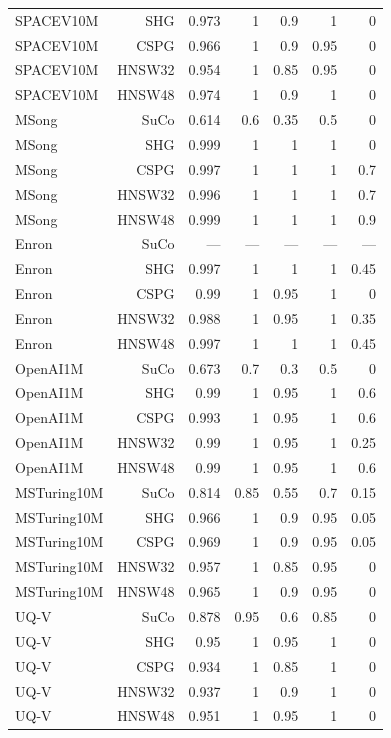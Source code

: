 \begin{table}[t]
\begin{tabular}{lrrrrrr}
SPACEV10M & SHG & 0.973 & 1 & 0.9 & 1 & 0 \\
SPACEV10M & CSPG & 0.966 & 1 & 0.9 & 0.95 & 0 \\
SPACEV10M & HNSW32 & 0.954 & 1 & 0.85 & 0.95 & 0 \\
SPACEV10M & HNSW48 & 0.974 & 1 & 0.9 & 1 & 0 \\
MSong & SuCo & 0.614 & 0.6 & 0.35 & 0.5 & 0 \\
MSong & SHG & 0.999 & 1 & 1 & 1 & 0 \\
MSong & CSPG & 0.997 & 1 & 1 & 1 & 0.7 \\
MSong & HNSW32 & 0.996 & 1 & 1 & 1 & 0.7 \\
MSong & HNSW48 & 0.999 & 1 & 1 & 1 & 0.9 \\
Enron & SuCo & — & — & — & — & — \\
Enron & SHG & 0.997 & 1 & 1 & 1 & 0.45 \\
Enron & CSPG & 0.99 & 1 & 0.95 & 1 & 0 \\
Enron & HNSW32 & 0.988 & 1 & 0.95 & 1 & 0.35 \\
Enron & HNSW48 & 0.997 & 1 & 1 & 1 & 0.45 \\
OpenAI1M & SuCo & 0.673 & 0.7 & 0.3 & 0.5 & 0 \\
OpenAI1M & SHG & 0.99 & 1 & 0.95 & 1 & 0.6 \\
OpenAI1M & CSPG & 0.993 & 1 & 0.95 & 1 & 0.6 \\
OpenAI1M & HNSW32 & 0.99 & 1 & 0.95 & 1 & 0.25 \\
OpenAI1M & HNSW48 & 0.99 & 1 & 0.95 & 1 & 0.6 \\
MSTuring10M & SuCo & 0.814 & 0.85 & 0.55 & 0.7 & 0.15 \\
MSTuring10M & SHG & 0.966 & 1 & 0.9 & 0.95 & 0.05 \\
MSTuring10M & CSPG & 0.969 & 1 & 0.9 & 0.95 & 0.05 \\
MSTuring10M & HNSW32 & 0.957 & 1 & 0.85 & 0.95 & 0 \\
MSTuring10M & HNSW48 & 0.965 & 1 & 0.9 & 0.95 & 0 \\
UQ-V & SuCo & 0.878 & 0.95 & 0.6 & 0.85 & 0 \\
UQ-V & SHG & 0.95 & 1 & 0.95 & 1 & 0 \\
UQ-V & CSPG & 0.934 & 1 & 0.85 & 1 & 0 \\
UQ-V & HNSW32 & 0.937 & 1 & 0.9 & 1 & 0 \\
UQ-V & HNSW48 & 0.951 & 1 & 0.95 & 1 & 0 \\
\bottomrule
\end{tabular}
\end{table}
